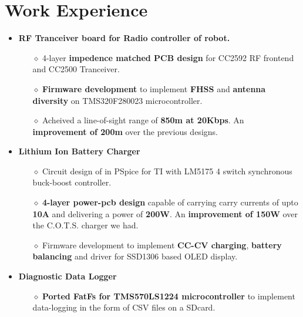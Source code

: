 \documentclass{resume}
\begin{document}
\section{Work Experience}
\vspace{0cm}
\begin{itemize}\setlength{\itemsep}{0pt}\setlength{\parskip}{0pt}\vspace{0cm}
    \item \textbf{RF Tranceiver board for Radio controller of robot.}
    \begin{itemize}\setlength{\itemsep}{0pt}\setlength{\parskip}{0pt}\vspace{-0.4em}
        \item[$\diamond$] 4-layer \textbf{impedence matched PCB design} for CC2592 RF frontend and CC2500 Tranceiver.
        \item[$\diamond$] \textbf{Firmware development} to implement \textbf{FHSS} and \textbf{antenna diversity} on TMS320F280023 microcontroller.
        \item[$\diamond$] Acheived a line-of-sight range of \textbf{850m at 20Kbps}. An \textbf{improvement of 200m} over the previous designs.
    \end{itemize}
    \vspace{-0.1cm}
    \item \textbf{Lithium Ion Battery Charger}
    \begin{itemize}\setlength{\itemsep}{0pt}\setlength{\parskip}{0pt}\vspace{-0.4em}
        \item[$\diamond$] Circuit design of in PSpice for TI with LM5175 4 switch synchronous buck-boost controller. 
        \item[$\diamond$] \textbf{4-layer power-pcb design} capable of carrying carry currents of upto \textbf{10A} and delivering a power of \textbf{200W}. An \textbf{improvement of 150W} over the C.O.T.S. charger we had.
        \item[$\diamond$] Firmware development to implement \textbf{CC-CV charging}, \textbf{battery balancing} and driver for SSD1306 based OLED display.
    \end{itemize}
    \vspace{-0.1cm}
    \item \textbf{Diagnostic Data Logger}
    \begin{itemize}\setlength{\itemsep}{0pt}\setlength{\parskip}{0pt}\vspace{-0.4em}
        \item[$\diamond$] \textbf{Ported FatFs for TMS570LS1224 microcontroller} to implement data-logging in the form of CSV files on a SDcard.
        \item[] 
    \end{itemize}
\end{itemize}
\end{document}
